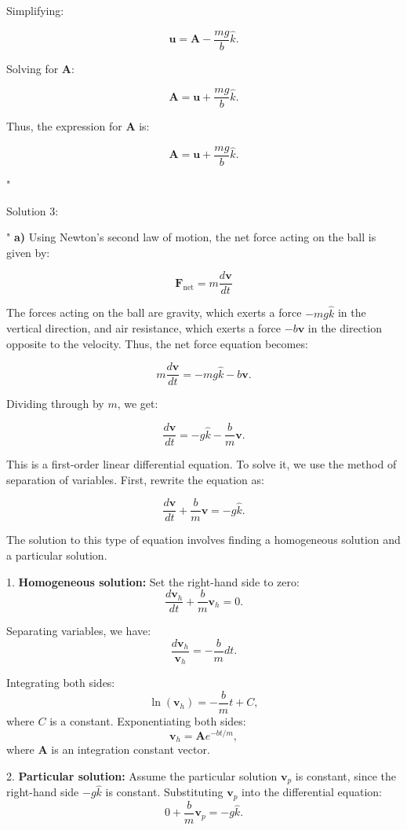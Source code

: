 Simplifying:

\[
\mathbf{u} = \mathbf{A} - \frac{mg}{b} \hat{k}.
\]

Solving for $\mathbf{A}$:

\[
\mathbf{A} = \mathbf{u} + \frac{mg}{b} \hat{k}.
\]

Thus, the expression for $\mathbf{A}$ is:

\[
\mathbf{A} = \mathbf{u} + \frac{mg}{b} \hat{k}.
\]

"

Solution 3:

"
\textbf{a)} Using Newton's second law of motion, the net force acting on the ball is given by:

\[
\mathbf{F}_{\text{net}} = m \frac{d\mathbf{v}}{dt}
\]

The forces acting on the ball are gravity, which exerts a force $-mg\hat{k}$ in the vertical direction, and air resistance, which exerts a force $-b\mathbf{v}$ in the direction opposite to the velocity. Thus, the net force equation becomes:

\[
m \frac{d\mathbf{v}}{dt} = -mg\hat{k} - b\mathbf{v}.
\]

Dividing through by $m$, we get:

\[
\frac{d\mathbf{v}}{dt} = -g\hat{k} - \frac{b}{m} \mathbf{v}.
\]

This is a first-order linear differential equation. To solve it, we use the method of separation of variables. First, rewrite the equation as:

\[
\frac{d\mathbf{v}}{dt} + \frac{b}{m} \mathbf{v} = -g\hat{k}.
\]

The solution to this type of equation involves finding a homogeneous solution and a particular solution.

1. \textbf{Homogeneous solution:} Set the right-hand side to zero:
\[
\frac{d\mathbf{v}_h}{dt} + \frac{b}{m} \mathbf{v}_h = 0.
\]

Separating variables, we have:
\[
\frac{d\mathbf{v}_h}{\mathbf{v}_h} = -\frac{b}{m} dt.
\]

Integrating both sides:
\[
\ln(\mathbf{v}_h) = -\frac{b}{m}t + C,
\]
where $C$ is a constant. Exponentiating both sides:
\[
\mathbf{v}_h = \mathbf{A} e^{-bt/m},
\]
where $\mathbf{A}$ is an integration constant vector.

2. \textbf{Particular solution:} Assume the particular solution $\mathbf{v}_p$ is constant, since the right-hand side $-g\hat{k}$ is constant. Substituting $\mathbf{v}_p$ into the differential equation:
\[
0 + \frac{b}{m} \mathbf{v}_p = -g\hat{k}.
\]

